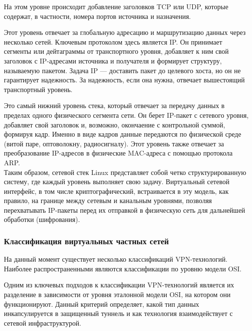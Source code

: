 На этом уровне происходит добавление заголовков TCP или UDP, которые содержат, в частности, номера портов источника и назначения.

Этот уровень отвечает за глобальную адресацию и маршрутизацию данных через несколько сетей.
Ключевым протоколом здесь является IP.
Он принимает сегменты или дейтаграммы от транспортного уровня, добавляет к ним свой заголовок с IP-адресами источника и получателя и формирует структуру, называемую пакетом.
Задача IP — доставить пакет до целевого хоста, но он не гарантирует надежность.
За надежность, если она нужна, отвечает вышестоящий транспортный уровень.


Это самый нижний уровень стека, который отвечает за передачу данных в пределах одного физического сегмента сети.
Он берет IP-пакет с сетевого уровня, добавляет свой заголовок и, возможно, окончаение с контрольной суммой, формируя кадр.
Именно в виде кадров данные передаются по физической среде (витой паре, оптоволокну, радиосигналу).
Этот уровень также отвечает за преобразование IP-адресов в физические MAC-адреса с помощью протокола ARP.\\

Таким образом, сетевой стек Linux представляет собой четко структурированную систему, где каждый уровень выполняет свою задачу.
Виртуальный сетевой интерфейс, в том числе криптографический, встраивается в эту модель, как правило, на границе между сетевым и канальным уровнями, позволяя перехватывать IP-пакеты перед их отправкой в физическую сеть для дальнейшей обработки (шифрования).

\subsubsection{Классификация виртуальных частных сетей}
На данный момент существует несколько классификаций VPN-технологий. Наиболее распространенными являются классификации по уровню модели OSI.

Одним из ключевых подходов к классификации VPN-технологий является их разделение в зависимости от уровня эталонной модели OSI, на котором они функционируют. Данный критерий определяет, какой тип данных инкапсулируется в защищенный туннель и как технология взаимодействует с сетевой инфраструктурой.

